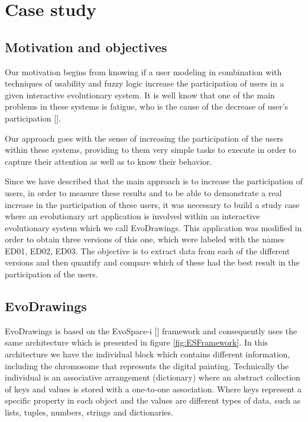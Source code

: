 \chapter{Case study} \label{sec:4}




\section{Motivation and objectives} 

Our motivation begins from knowing if a user modeling in combination with
techniques of usability and fuzzy logic increase the participation of users in a
given interactive evolutionary system. It is well know that one of the main
problems in these systems is fatigue, who is the cause of the decrease of user's
participation [].

Our approach goes with the sense of increasing the participation of the users
within these systems, providing to them very simple tasks to execute in order to
capture their attention as well as to know their behavior.

Since we have described that the main approach is to increase the participation
of users, in order to measure these results and to be able to demonstrate a real
increase in the participation of these users, it was necessary to build a study
case where an evolutionary art application is involved within an interactive
evolutionary system which we call EvoDrawings. This application was modified in
order to obtain three versions of this one, which were labeled with the names
ED01, ED02, ED03. The objective is to extract data from each of the different
versions and then quantify and compare which of these had the best result in the
participation of the users.

\section{EvoDrawings} EvoDrawings is based on the EvoSpace-i [] framework and
consequently uses the same architecture which is presented in figure
\ref{fig:ESFramework}. In this architecture we have the individual block which
contains different information, including the chromosome that represents the
digital painting. Technically the individual is an associative arrangement
(dictionary) where an abstract collection of keys and values is stored with a
one-to-one association. Where keys represent a specific property in each object
and the values are different types of data, such as lists, tuples, numbers,
strings and dictionaries.

